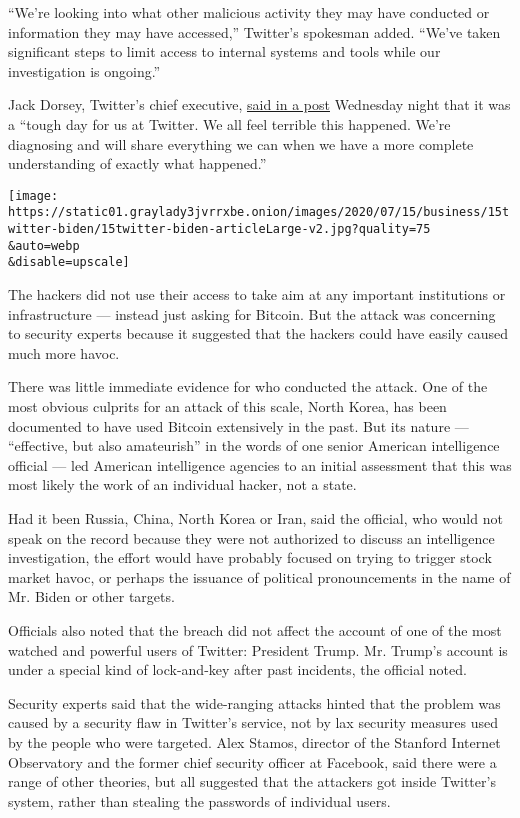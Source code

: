 ``We're looking into what other malicious activity they may have
conducted or information they may have accessed,'' Twitter's spokesman
added. ``We've taken significant steps to limit access to internal
systems and tools while our investigation is ongoing.''

Jack Dorsey, Twitter's chief executive,
\href{https://twitter.com/jack/status/1283571658339397632?s=21}{said in
a post} Wednesday night that it was a ``tough day for us at Twitter. We
all feel terrible this happened. We're diagnosing and will share
everything we can when we have a more complete understanding of exactly
what happened.''

\texttt{[image: https://static01.graylady3jvrrxbe.onion/images/2020/07/15/business/15twitter-biden/15twitter-biden-articleLarge-v2.jpg?quality=75\\\&auto=webp\\\&disable=upscale]}

The hackers did not use their access to take aim at any important
institutions or infrastructure --- instead just asking for Bitcoin. But
the attack was concerning to security experts because it suggested that
the hackers could have easily caused much more havoc.

There was little immediate evidence for who conducted the attack. One of
the most obvious culprits for an attack of this scale, North Korea, has
been documented to have used Bitcoin extensively in the past. But its
nature --- ``effective, but also amateurish'' in the words of one senior
American intelligence official --- led American intelligence agencies to
an initial assessment that this was most likely the work of an
individual hacker, not a state.

Had it been Russia, China, North Korea or Iran, said the official, who
would not speak on the record because they were not authorized to
discuss an intelligence investigation, the effort would have probably
focused on trying to trigger stock market havoc, or perhaps the issuance
of political pronouncements in the name of Mr. Biden or other targets.

Officials also noted that the breach did not affect the account of one
of the most watched and powerful users of Twitter: President Trump. Mr.
Trump's account is under a special kind of lock-and-key after past
incidents, the official noted.

Security experts said that the wide-ranging attacks hinted that the
problem was caused by a security flaw in Twitter's service, not by lax
security measures used by the people who were targeted. Alex Stamos,
director of the Stanford Internet Observatory and the former chief
security officer at Facebook, said there were a range of other theories,
but all suggested that the attackers got inside Twitter's system, rather
than stealing the passwords of individual users.

